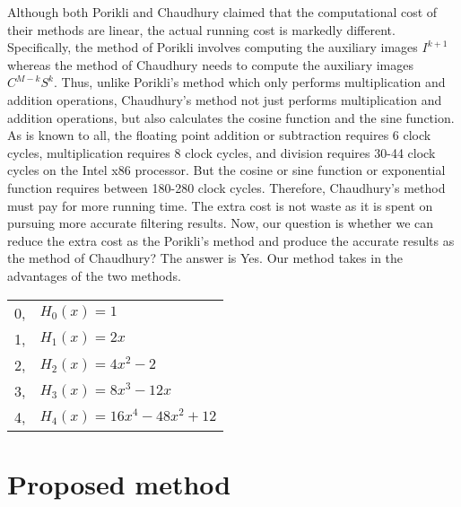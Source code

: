 \documentclass[twocolumn]{el-author}
\begin{document}
Although both Porikli and Chaudhury claimed that the computational cost of their methods are linear, the actual running cost is markedly  different. Specifically, the method of Porikli involves computing the auxiliary images $I^{k+1}$ whereas the method of Chaudhury needs to compute the auxiliary images $C^{M-k}S^k$. Thus, unlike Porikli's method which only performs multiplication and addition operations, Chaudhury's method not just performs multiplication and addition operations, but also calculates the cosine function and the sine function. As is known to all, the floating point addition or subtraction requires 6 clock cycles, multiplication requires 8 clock cycles, and division requires 30-44 clock cycles on the Intel x86 processor. But the cosine or sine function or exponential function requires between 180-280 clock cycles. Therefore, Chaudhury's method must pay for more running time. The extra cost is not waste as it is spent on pursuing more accurate filtering results. Now, our question is whether we can reduce the extra cost as the Porikli's method and produce the accurate results as the method of Chaudhury? The answer is Yes. Our method takes in the advantages of the two methods.

%
\begin{table}[t]
{\begin{tabular}{l|l}\hline
0, & $H_0(x)=1$ \\
1, & $H_1(x)=2x$  \\
2, & $H_2(x)=4x^2-2$ \\
3, & $H_3(x)=8x^3-12x$ \\
4, & $H_4(x)=16x^4-48x^2+12$ \\\hline
\end{tabular}\label{tab:Hermite}}{}
\end{table}

\section{Proposed method }
\end{document}
